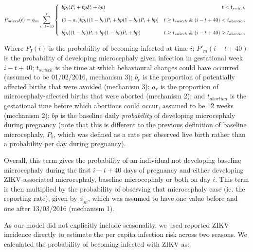 \documentclass[10pt,letterpaper]{article}
\begin{document}
\begin{equation}
P_{micro}(t) = \phi_{m}\sum^t_{i=t-40}\left\{\begin{array}{lr}
\bar{bp_i}(P_i + bpP_i + bp) & t < t_{switch} \\\\
(1-a_r)\bar{bp_i}((1-b_r)P_i + bp(1-b_r)P_i + bp) & t \geq t_{switch} \hspace{0.1cm}\&\hspace{0.1cm} (i - t + 40) <  t_{abortion}\\\\ 
\bar{bp_i}((1-b_r)P_i +bp(1-b_r)P_i + bp) & t \geq t_{switch} \hspace{0.1cm}\&\hspace{0.1cm}(i - t + 40) \geq  t_{abortion}
\end{array}
\right.
\end{equation}

Where \(P_I(i)\) is the probability of becoming infected at time \(i\);
\(P'_m(i -t + 40)\) is the probability of developing microcephaly given
infection in gestational week \(i - t + 40\); \(t_{switch}\) is the time
at which behavioural changes could have occurred (assumed to be
01/02/2016, mechanism 3); \(b_r\) is the proportion of potentially
affected births that were avoided (mechanism 3); \(a_r\) is the
proportion of microcephaly-affected births that were aborted (mechanism
2); and \(t_{abortion}\) is the gestational time before which abortions
could occur, assumed to be 12 weeks (mechanism 2); \(bp\) is the
baseline daily \emph{probability} of developing microcephaly during
pregnancy (note that this is different to the previous definition of
baseline microcephaly, \(P_b\), which was defined as a rate per observed
live birth rather than a probability per day during pregnancy).

Overall, this term gives the probability of an individual not developing
baseline microcephaly during the first \(i - t + 40\) days of pregnancy
and either developing ZIKV-associated microcephaly, baseline
microcephaly or both on day \(i\). This term is then multiplied by the
probability of observing that microcephaly case (ie. the reporting
rate), given by \(\phi_m\), which was assumed to have one value before
and one after 13/03/2016 (mechanism 1).

As our model did not explicitly include seasonality, we used reported
ZIKV incidence directly to estimate the per capita infection risk across
two seasons. We calculated the probability of becoming infected with
ZIKV as:
\end{document}
